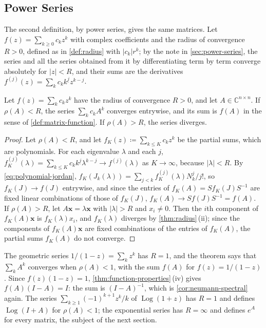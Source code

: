 \subsection{Power Series}

The second definition, by power series, gives the same matrices. Let $f(z)=\sum_{k\ge0}c_kz^k$ with complex coefficients and the radius of convergence $R>0$, defined as in \cref{def:radius} with $|c_k|r^k$; by the note in \cref{sec:power-series}, the series and all the series obtained from it by differentiating term by term converge absolutely for $|z|<R$, and their sums are the derivatives $f^{(j)}(z)=\sum_kc_kk^{\underline j}z^{k-j}$.

\begin{theorem}
\label{thm:power-series-matrix}
Let $f(z)=\sum_kc_kz^k$ have the radius of convergence $R>0$, and let $A\in\mathbb C^{n\times n}$. If $\rho(A)<R$, the series $\sum_kc_kA^k$ converges entrywise, and its sum is $f(A)$ in the sense of \cref{def:matrix-function}. If $\rho(A)>R$, the series diverges.
\end{theorem}

\begin{proof}
Let $\rho(A)<R$, and let $f_K(z)\coloneqq\sum_{k\le K}c_kz^k$ be the partial sums, which are polynomials. For each eigenvalue $\lambda$ and each $j$, $f_K^{(j)}(\lambda)=\sum_{k\le K}c_kk^{\underline j}\lambda^{k-j}\to f^{(j)}(\lambda)$ as $K\to\infty$, because $|\lambda|<R$. By \eqref{eq:polynomial-jordan}, $f_K(J_k(\lambda))=\sum_{j<k}f_K^{(j)}(\lambda)N_k^j/j!$, so $f_K(J)\to f(J)$ entrywise, and since the entries of $f_K(A)=Sf_K(J)S^{-1}$ are fixed linear combinations of those of $f_K(J)$, $f_K(A)\to Sf(J)S^{-1}=f(A)$. If $\rho(A)>R$, let $A\mathbf x=\lambda\mathbf x$ with $|\lambda|>R$ and $x_i\ne0$. Then the $i$th component of $f_K(A)\mathbf x$ is $f_K(\lambda)x_i$, and $f_K(\lambda)$ diverges by \cref{thm:radius}\,(ii); since the components of $f_K(A)\mathbf x$ are fixed combinations of the entries of $f_K(A)$, the partial sums $f_K(A)$ do not converge.
\end{proof}

The geometric series $1/(1-z)=\sum_kz^k$ has $R=1$, and the theorem says that $\sum_kA^k$ converges when $\rho(A)<1$, with the sum $f(A)$ for $f(z)=1/(1-z)$. Since $f(z)(1-z)=1$, \cref{thm:function-properties}\,(iv) gives $f(A)(I-A)=I$: the sum is $(I-A)^{-1}$, which is \cref{cor:neumann-spectral} again. The series $\sum_{k\ge1}(-1)^{k+1}z^k/k$ of $\operatorname{Log}(1+z)$ has $R=1$ and defines $\operatorname{Log}(I+A)$ for $\rho(A)<1$; the exponential series has $R=\infty$ and defines $e^A$ for every matrix, the subject of the next section.

